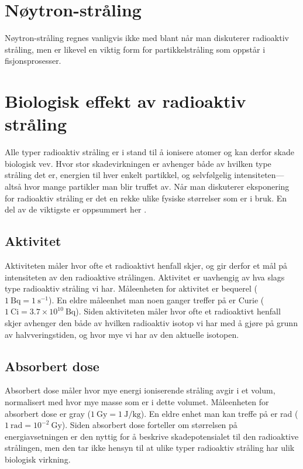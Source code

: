 \section{Nøytron-stråling}
Nøytron-stråling regnes vanligvis ikke med blant når man diskuterer radioaktiv stråling, men er likevel en viktig form for partikkelstråling som oppstår i fisjonsprosesser. 

\section{Biologisk effekt av radioaktiv stråling}
Alle typer radioaktiv stråling er i stand til å ionisere atomer og kan derfor skade biologisk vev. Hvor stor skadevirkningen er avhenger både av hvilken type stråling det er, energien til hver enkelt partikkel, og selvfølgelig intensiteten---altså hvor mange partikler man blir truffet av. Når man diskuterer eksponering for radioaktiv stråling er det en rekke ulike fysiske størrelser som er i bruk. En del av de viktigste er oppsummert her \cite{Agashe:2014kda}.

\subsection{Aktivitet}
Aktiviteten måler hvor ofte et radioaktivt henfall skjer, og gir derfor et mål på intensiteten av den radioaktive strålingen. Aktivitet er uavhengig av hva slags type radioaktiv stråling vi har. Måleenheten for aktivitet er bequerel ($1~\mathrm{Bq} = 1~\mathrm{s^{-1}}$). En eldre måleenhet man noen ganger treffer på er Curie ($1~\mathrm{Ci} = 3.7\times10^{10}~\mathrm{Bq}$). Siden aktiviteten måler hvor ofte et radioaktivt henfall skjer avhenger den både av hvilken radioaktiv isotop vi har med å gjøre på grunn av halvveringstiden, og hvor mye vi har av den aktuelle isotopen. 

\subsection{Absorbert dose}
Absorbert dose måler hvor mye energi ioniserende stråling avgir i et volum, normalisert med hvor mye masse som er i dette volumet. Måleenheten for absorbert dose er gray ($1~\mathrm{Gy}= 1~\mathrm{J/kg}$). En eldre enhet man kan treffe på er rad ($1~\mathrm{rad} = 10^{-2}~\mathrm{Gy}$). Siden absorbert dose forteller om størrelsen på energiavsetningen er den nyttig for å beskrive skadepotensialet til den radioaktive strålingen, men den tar ikke hensyn til at ulike typer radioaktiv stråling har ulik biologisk virkning.

